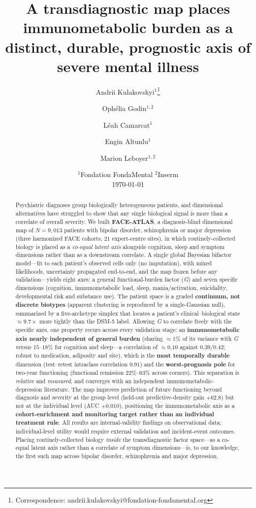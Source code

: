 \documentclass[11pt]{article}
\title{\bfseries A transdiagnostic map places immunometabolic burden
as a distinct, durable, prognostic axis of severe mental illness}
\author{%
  Andrii Kulakovskyi$^{1}$\thanks{Correspondence: andrii.kulakovskyi@fondation-fondamental.org}\and
  Ophélia Godin$^{1,2}$\and
  Léah Camarcat$^{1}$\and
  Engin Altunlu$^{1}$\and
  Marion Leboyer$^{1,2}$
}
\date{%
  $^{1}$Fondation FondaMental \quad
  $^{2}$Inserm\\[4pt]
  \today
}
\newcommand{\Gfac}{\textit{G}} %
\begin{document}
\maketitle

\begin{abstract}
\noindent
Psychiatric diagnoses group biologically heterogeneous patients, and dimensional
alternatives have struggled to show that any single biological signal is more than a
correlate of overall severity. We built \textbf{FACE-ATLAS}, a diagnosis-blind dimensional
map of $N=9{,}013$ patients with bipolar disorder, schizophrenia or major depression (three
harmonized FACE cohorts, 21 expert-centre sites), in which routinely-collected biology is
placed as a \emph{co-equal latent axis} alongside cognition, sleep and symptom dimensions
rather than as a downstream correlate. A single global Bayesian bifactor model---fit to each
patient's observed cells only (no imputation), with mixed likelihoods, uncertainty propagated
end-to-end, and the map frozen before any validation---yields eight axes: a general
functional-burden factor (\Gfac) and seven specific dimensions (cognition, immunometabolic
load, sleep, mania/activation, suicidality, developmental risk and substance use). The patient
space is a graded \textbf{continuum, not discrete biotypes} (apparent clustering is reproduced
by a single-Gaussian null), summarized by a five-archetype simplex that locates a patient's
clinical--biological state $\approx 9.7\times$ more tightly than the DSM-5 label. Allowing
\Gfac{} to correlate freely with the specific axes, one property recurs across every validation
stage: an \textbf{immunometabolic axis nearly independent of general burden} (sharing
$\approx 1\%$ of its variance with \Gfac{} versus $15$--$18\%$ for cognition and sleep---a
correlation of $\approx 0.10$ against $0.39$/$0.42$; robust to medication, adiposity and site), which is the \textbf{most temporally
durable} dimension (test--retest intraclass correlation $0.91$) and the \textbf{worst-prognosis
pole} for two-year functioning (functional remission $22\%$--$63\%$ across corners). This
separation is \emph{relative} and \emph{measured}, and converges with an independent
immunometabolic-depression literature. The map improves prediction of future functioning beyond
diagnosis and severity at the group level (held-out predictive-density gain $+62.8$) but not at
the individual level (AUC $+0.010$), positioning the immunometabolic axis as a
\textbf{cohort-enrichment and monitoring target rather than an individual treatment rule}. All
results are internal-validity findings on observational data; individual-level utility would
require external validation and incident-event outcomes. Placing routinely-collected biology
\emph{inside} the transdiagnostic factor space---as a co-equal latent axis rather than a
correlate of symptom dimensions---is, to our knowledge, the first such map across bipolar
disorder, schizophrenia and major depression.
\end{abstract}



\clearpage







\end{document}
